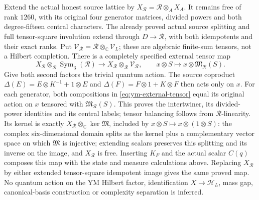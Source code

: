 Extend the actual honest source lattice by
$X_{\mathcal R}=\mathcal R\otimes_A X_A$.
It remains free of rank $1260$, with its original four generator
matrices, divided powers and both degree-fifteen central characters.
The already proved actual source splitting and full tensor-square
involution extend through $D\to\mathcal R$, with both idempotents
and their exact ranks. Put
$\mathscr V_{\mathcal R}=\mathcal R\otimes_{\mathbb C}\mathscr V_L$;
these are algebraic finite-sum tensors, not a Hilbert completion.
There is a completely specified external tensor map
\begin{equation}\label{eq:ym-external-tensor}
 X_{\mathcal R}\otimes_{\mathcal R}\operatorname{Sym}_3(\mathcal R)
 \longrightarrow X_{\mathcal R}\otimes_{\mathcal R}\mathscr V_{\mathcal R},
 \qquad x\otimes S\longmapsto x\otimes\mathfrak M_{\mathcal R}(S).
\end{equation}
Give both second factors the trivial quantum action. The source
coproduct
$\Delta(E)=E\otimes K^{-1}+1\otimes E$ and
$\Delta(F)=F\otimes1+K\otimes F$ then acts only on $x$.
For each generator, both compositions in
\eqref{eq:ym-external-tensor} equal its original action on $x$
tensored with $\mathfrak M_{\mathcal R}(S)$. This proves the
intertwiner, its divided-power identities and its central labels;
tensor balancing follows from $\mathcal R$-linearity.
Its kernel is exactly
$X_{\mathcal R}\otimes_{\mathbb C}\ker\mathfrak M$, included by
$x\otimes S\mapsto x\otimes(1\otimes S)$:
the complex six-dimensional domain splits as the kernel plus
a complementary vector space on which $\mathfrak M$ is
injective; extending scalars preserves this splitting and its
inverse on the image, and $X_{\mathcal R}$ is free.
Inserting $K_F$ and the actual scalar $C(q)$ composes this map
with the state and measure calculations above. Replacing
$X_{\mathcal R}$ by either extended tensor-square idempotent
image gives the same proved map. No quantum action on the YM
Hilbert factor, identification $X\to\mathscr H_L$, mass gap,
canonical-basis construction or complexity separation is inferred.
